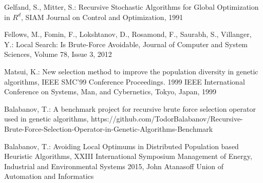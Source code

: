 \begin{thebibliography}{99.}
 Gelfand, S., Mitter, S.: Recursive Stochastic Algorithms for Global Optimization in $R^d$, SIAM Journal on Control and Optimization, 1991

 Fellows, M., Fomin, F., Lokshtanov, D., Rosamond, F., Saurabh, S., Villanger, Y.: Local Search: Is Brute-Force Avoidable, Journal of Computer and System Sciences, Volume 78, Issue 3, 2012

 Matsui, K.: New selection method to improve the population diversity in genetic algorithms, IEEE SMC'99 Conference Proceedings. 1999 IEEE International Conference on Systems, Man, and Cybernetics, Tokyo, Japan, 1999

 Balabanov, T.: A benchmark project for recursive brute force selection operator used in genetic algorithms, https://github.com/TodorBalabanov/Recursive-Brute-Force-Selection-Operator-in-Genetic-Algorithms-Benchmark

 Balabanov, T.: Avoiding Local Optimums in Distributed Population based Heuristic Algorithms, XXIII International Symposium Management of Energy, Industrial and Environmental Systems 2015, John Atanasoff Union of Automation and Informatics

\end{thebibliography}
